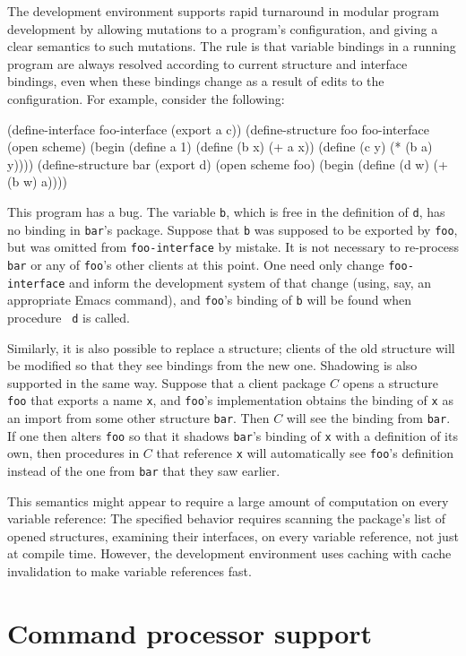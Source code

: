 The \hack{} development environment supports rapid turnaround in
modular program development by allowing mutations to a program's
configuration, and giving a clear semantics to such mutations.  The
rule is that variable bindings in a running program are always
resolved according to current structure and interface bindings, even
when these bindings change as a result of edits to the configuration.
For example, consider the following:
\begin{example}
(define-interface foo-interface (export a c))
(define-structure foo foo-interface
  (open scheme)
  (begin (define a 1)
         (define (b x) (+ a x))
         (define (c y) (* (b a) y))))
(define-structure bar (export d)
  (open scheme foo)
  (begin (define (d w) (+ (b w) a))))
\end{example}
This program has a bug.  The variable {\tt b}, which is free in the
definition of {\tt d}, has no binding in {\tt bar}'s package.  Suppose
that {\tt b} was supposed to be exported by {\tt foo}, but was omitted
from {\tt foo-interface} by mistake.  It is not necessary to
re-process {\tt bar} or any of {\tt foo}'s other clients at this point.
One need only change {\tt foo-interface} and inform the development
system of that change (using, say, an appropriate Emacs command),
and {\tt foo}'s binding of {\tt b} will be found when procedure {\tt
d} is called.

Similarly, it is also possible to replace a structure; clients of the
old structure will be modified so that they see bindings from the new
one.  Shadowing is also supported in the same way.  Suppose that a
client package $C$ opens a structure {\tt foo} that exports a name
{\tt x}, and {\tt foo}'s implementation obtains the binding of {\tt x}
as an import from some other structure {\tt bar}.  Then $C$ will see
the binding from {\tt bar}.  If one then alters {\tt foo} so that it
shadows {\tt bar}'s binding of {\tt x} with a definition of its own,
then procedures in $C$ that reference {\tt x} will automatically see
{\tt foo}'s definition instead of the one from {\tt bar} that they saw
earlier.

This semantics might appear to require a large amount of computation
on every variable reference: The specified behavior requires scanning
the package's list of opened structures, examining their interfaces,
on every variable reference, not just at compile time.  However, the
development environment uses caching with cache invalidation to make
variable references fast.


\section{Command processor support}
\label{module-commands}

